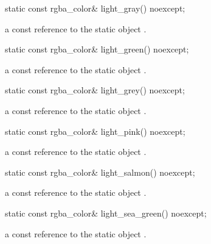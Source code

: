 \begin{itemdecl}
static const rgba_color& light_gray() noexcept;
\end{itemdecl}
\begin{itemdescr}
\pnum
\returns
a const reference to the static  object .
\end{itemdescr}

\begin{itemdecl}
static const rgba_color& light_green() noexcept;
\end{itemdecl}
\begin{itemdescr}
\pnum
\returns
a const reference to the static  object .
\end{itemdescr}

\begin{itemdecl}
static const rgba_color& light_grey() noexcept;
\end{itemdecl}
\begin{itemdescr}
\pnum
\returns
a const reference to the static  object .
\end{itemdescr}

\begin{itemdecl}
static const rgba_color& light_pink() noexcept;
\end{itemdecl}
\begin{itemdescr}
\pnum
\returns
a const reference to the static  object .
\end{itemdescr}

\begin{itemdecl}
static const rgba_color& light_salmon() noexcept;
\end{itemdecl}
\begin{itemdescr}
\pnum
\returns
a const reference to the static  object .
\end{itemdescr}

\begin{itemdecl}
static const rgba_color& light_sea_green() noexcept;
\end{itemdecl}
\begin{itemdescr}
\pnum
\returns
a const reference to the static  object .
\end{itemdescr}

